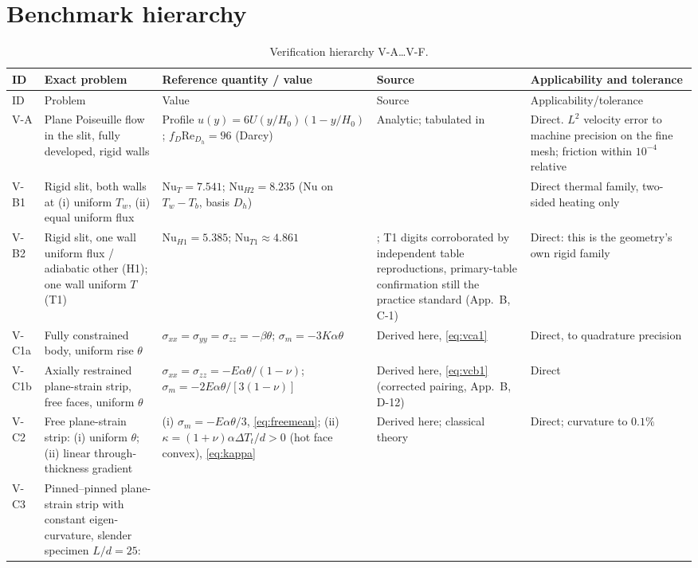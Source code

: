 \section{Benchmark hierarchy}
\begin{longtable}{p{1.1cm}p{3.4cm}p{3.4cm}p{3.2cm}p{3.2cm}}
\caption{Verification hierarchy V-A\ldots V-F.}\label{tab:validation}\\
\toprule
ID & Exact problem & Reference quantity / value & Source & Applicability and tolerance \\
\midrule
\endfirsthead
\toprule
ID & Problem & Value & Source & Applicability/tolerance \\
\midrule
\endhead
V-A & Plane Poiseuille flow in the slit, fully developed, rigid walls &
Profile $u(y)=6U(y/H_0)(1-y/H_0)$; $f_D\mathrm{Re}_{D_h}=96$ (Darcy) &
Analytic; tabulated in \cite{shah1978laminar} &
Direct. $L^2$ velocity error to machine precision on the fine mesh; friction within $10^{-4}$ relative \\
V-B1 & Rigid slit, both walls at (i) uniform $T_w$, (ii) equal uniform flux &
$\mathrm{Nu}_T=7.541$; $\mathrm{Nu}_{H2}=8.235$ ($\mathrm{Nu}$ on $T_w-T_b$, basis $D_h$) &
\cite{shah1978laminar} &
Direct thermal family, two-sided heating only \\
V-B2 & Rigid slit, one wall uniform flux / adiabatic other (H1); one wall uniform $T$ (T1) &
$\mathrm{Nu}_{H1}=5.385$; $\mathrm{Nu}_{T1}\approx4.861$ &
\cite{shah1978laminar}; T1 digits corroborated by independent table reproductions, primary-table confirmation still the practice standard (App.~B, C-1) &
Direct: this is the geometry's own rigid family \\
V-C1a & Fully constrained body, uniform rise $\theta$ &
$\sigma_{xx}=\sigma_{yy}=\sigma_{zz}=-\beta\theta$; $\sigma_m=-3K\alpha\theta$ &
Derived here, \eqref{eq:vca1} &
Direct, to quadrature precision \\
V-C1b & Axially restrained plane-strain strip, free faces, uniform $\theta$ &
$\sigma_{xx}=\sigma_{zz}=-E\alpha\theta/(1-\nu)$; $\sigma_m=-2E\alpha\theta/[3(1-\nu)]$ &
Derived here, \eqref{eq:vcb1} (corrected pairing, App.~B, D-12) & Direct \\
V-C2 & Free plane-strain strip: (i) uniform $\theta$; (ii) linear through-thickness gradient &
(i) $\sigma_m=-E\alpha\theta/3$, \eqref{eq:freemean}; (ii) $\kappa=(1+\nu)\alpha\Delta T_t/d>0$ (hot face convex), \eqref{eq:kappa} &
Derived here; classical theory \cite{boley1960theory} & Direct; curvature to $0.1\%$ \\
V-C3 & Pinned--pinned plane-strain strip with constant eigen-curvature, slender specimen $L/d=25$:

\end{longtable}
